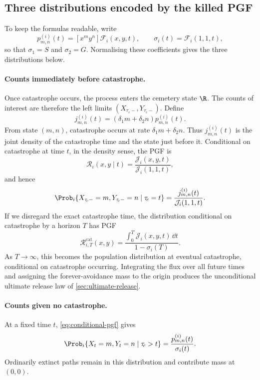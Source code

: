 \subsection{Three distributions encoded by the killed PGF}
\label{sec:three-pgf-distributions}

To keep the formulas readable, write
\begin{equation*}
p_{m,n}^{(i)}(t)
=[x^my^n]\mathcal F_i(x,y,t),
\qquad
\sigma_i(t)=\mathcal F_i(1,1,t),
\end{equation*}
so that $\sigma_1=S$ and $\sigma_2=G$. Normalising these coefficients gives the three distributions below.

\paragraph{Counts immediately before catastrophe.}
Once catastrophe occurs, the process enters the cemetery state $\R$. The counts of interest are therefore the left limits $(X_{\tau_{\!c}-},Y_{\tau_{\!c}-})$. Define
\begin{equation*}
j_{m,n}^{(i)}(t)
=(\delta_1m+\delta_2n)p_{m,n}^{(i)}(t).
\end{equation*}
From state $(m,n)$, catastrophe occurs at rate $\delta_1m+\delta_2n$. Thus $j_{m,n}^{(i)}(t)$ is the joint density of the catastrophe time and the state just before it. Conditional on catastrophe at time $t$, in the density sense, the PGF is
\begin{equation*}
\mathcal R_i(x,y\mid t)
=\frac{\mathcal J_i(x,y,t)}
{\mathcal J_i(1,1,t)},
\end{equation*}
and hence
\begin{equation*}
\Prob_i\{X_{\tau_{\!c}-}=m,Y_{\tau_{\!c}-}=n
\mid\tau_{\!c}=t\}
=\frac{j_{m,n}^{(i)}(t)}
{\mathcal J_i(1,1,t)}.
\end{equation*}
If we disregard the exact catastrophe time, the distribution conditional on catastrophe by a horizon $T$ has PGF
\begin{equation*}
\mathcal R_{i,T}^{\mathrm{cat}}(x,y)
=\frac{\displaystyle\int_0^T
\mathcal J_i(x,y,t)\,\dd t}
{1-\sigma_i(T)}.
\end{equation*}
As $T\to\infty$, this becomes the population distribution at eventual catastrophe, conditional on catastrophe occurring. Integrating the flux over all future times and assigning the forever-avoidance mass to the origin produces the unconditional ultimate release law of \cref{sec:ultimate-release}.

\paragraph{Counts given no catastrophe.}
At a fixed time $t$, \cref{eq:conditional-pgf} gives
\begin{equation*}
\Prob_i\{X_t=m,Y_t=n\mid\tau_{\!c}>t\}
=\frac{p_{m,n}^{(i)}(t)}{\sigma_i(t)}.
\end{equation*}
Ordinarily extinct paths remain in this distribution and contribute mass at $(0,0)$.

